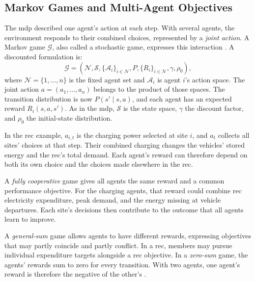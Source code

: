 \subsection{Markov Games and Multi-Agent Objectives}
\label{sec:ch2-markov-games}

The \gls{mdp} described one agent's action at each step. With several agents, the environment responds to their combined choices, represented by a \emph{joint action}. A Markov game $\mathcal G$, also called a stochastic game, expresses this interaction \parencite{shapley1953stochastic,littman1994markovgames}. A discounted formulation is:
\begin{equation}
\mathcal G=\left(\mathcal N,\mathcal S,
\{\mathcal A_i\}_{i\in\mathcal N},P,
\{R_i\}_{i\in\mathcal N},\gamma,\rho_0\right),
\label{eq:ch2-markov-game}
\end{equation}
where $\mathcal N=\{1,\ldots,n\}$ is the fixed agent set and $\mathcal A_i$ is agent $i$'s action space. The joint action $a=(a_1,\ldots,a_n)$ belongs to the product of those spaces. The transition distribution is now $P(s'\mid s,a)$, and each agent has an expected reward $R_i(s,a,s')$. As in the \gls{mdp}, $\mathcal S$ is the state space, $\gamma$ the discount factor, and $\rho_0$ the initial-state distribution.

In the \gls{rec} example, $a_{i,t}$ is the charging power selected at site $i$, and $a_t$ collects all sites' choices at that step. Their combined charging changes the vehicles' stored energy and the \gls{rec}'s total demand. Each agent's reward can therefore depend on both its own choice and the choices made elsewhere in the \gls{rec}.

A \emph{fully cooperative} game gives all agents the same reward and a common performance objective. For the charging agents, that reward could combine \gls{rec} electricity expenditure, peak demand, and the energy missing at vehicle departures. Each site's decisions then contribute to the outcome that all agents learn to improve.

A \emph{general-sum} game allows agents to have different rewards, expressing objectives that may partly coincide and partly conflict. In a \gls{rec}, members may pursue individual expenditure targets alongside a \gls{rec} objective. In a \emph{zero-sum} game, the agents' rewards sum to zero for every transition. With two agents, one agent's reward is therefore the negative of the other's \parencite{wang2022coopcompetitive,moret2019energycollectives}.

